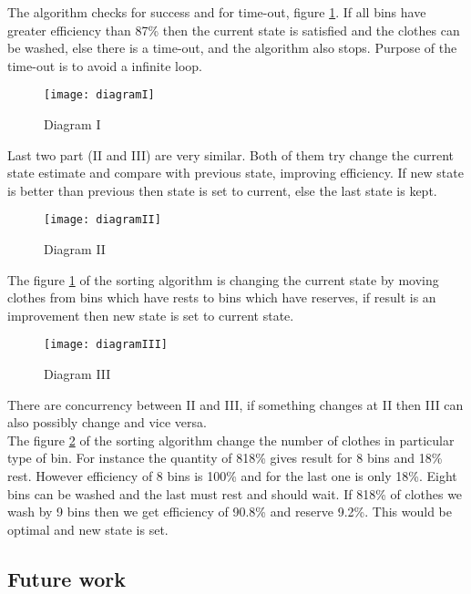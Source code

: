 The algorithm checks for success and for time-out, figure \ref{fig:diagramI}. If all bins have greater efficiency than 87\% then the current state is satisfied and the clothes can be washed, else there is a time-out, and the algorithm also stops. Purpose of the time-out is to avoid a infinite loop.

\begin{figure}[h]
	\centering
		\texttt{[image: diagramI]}
	\caption{Diagram I}
	\label{fig:diagramI}
\end{figure}

Last two part (II and III) are very similar. Both of them try change the current state estimate and compare with previous state, improving efficiency. If new state is better than previous then state is set to current, else the last state is kept.  \newpage

\begin{figure}[h]
	\centering
		\texttt{[image: diagramII]}
	\caption{Diagram II}
	\label{fig:diagramII}
\end{figure}

The figure \ref{fig:diagramI} of the sorting algorithm is changing the current state by moving clothes from bins which have rests to bins which have reserves, if result is an improvement then new state is set to current state. 

\begin{figure}[h]
	\centering
		\texttt{[image: diagramIII]}
	\caption{Diagram III}
	\label{fig:diagramIII}
\end{figure}
There are concurrency between II and III, if something changes at II then III can also possibly change and vice versa.
\\
The figure \ref{fig:diagramII} of the sorting algorithm change the number of clothes in particular type of bin. For instance the quantity of 818\% gives result for 8 bins and 18\% rest. However efficiency of 8 bins is 100\% and for the last one is only 18\%. Eight bins can be washed and the last must rest and should wait. If 818\% of clothes we wash by 9 bins then we get efficiency of 90.8\% and reserve 9.2\%. This would be optimal and new state is set.

\subsection{Future work}
